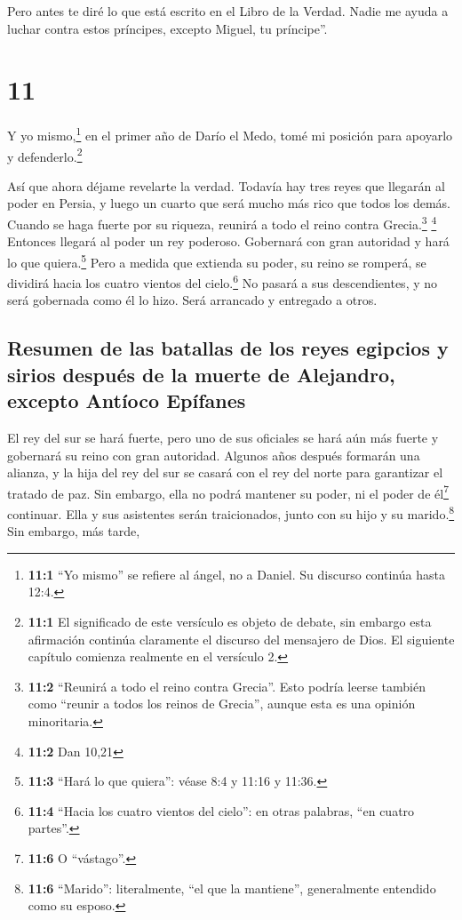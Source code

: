  Pero antes te diré lo que está escrito en el Libro de la
Verdad. Nadie me ayuda a luchar contra estos príncipes, excepto Miguel,
tu príncipe''.

\hypertarget{section-10}{%
\section{11}\label{section-10}}

 Y yo mismo,\footnote{\textbf{11:1} ``Yo mismo'' se
  refiere al ángel, no a Daniel. Su discurso continúa hasta 12:4.} en el
primer año de Darío el Medo, tomé mi posición para apoyarlo y
defenderlo.\footnote{\textbf{11:1} El significado de este versículo es
  objeto de debate, sin embargo esta afirmación continúa claramente el
  discurso del mensajero de Dios. El siguiente capítulo comienza
  realmente en el versículo 2.}

 Así que ahora déjame revelarte la verdad. Todavía hay
tres reyes que llegarán al poder en Persia, y luego un cuarto que será
mucho más rico que todos los demás. Cuando se haga fuerte por su
riqueza, reunirá a todo el reino contra Grecia.\footnote{\textbf{11:2}
  ``Reunirá a todo el reino contra Grecia''. Esto podría leerse también
  como ``reunir a todos los reinos de Grecia'', aunque esta es una
  opinión minoritaria.} \footnote{\textbf{11:2} Dan 10,21}
 Entonces llegará al poder un rey poderoso. Gobernará con
gran autoridad y hará lo que quiera.\footnote{\textbf{11:3} ``Hará lo
  que quiera'': véase 8:4 y 11:16 y 11:36.}  Pero a medida
que extienda su poder, su reino se romperá, se dividirá hacia los cuatro
vientos del cielo.\footnote{\textbf{11:4} ``Hacia los cuatro vientos del
  cielo'': en otras palabras, ``en cuatro partes''.} No pasará a sus
descendientes, y no será gobernada como él lo hizo. Será arrancado y
entregado a otros.

\hypertarget{resumen-de-las-batallas-de-los-reyes-egipcios-y-sirios-despuuxe9s-de-la-muerte-de-alejandro-excepto-antuxedoco-epuxedfanes}{%
\subsection{Resumen de las batallas de los reyes egipcios y sirios
después de la muerte de Alejandro, excepto Antíoco
Epífanes}\label{resumen-de-las-batallas-de-los-reyes-egipcios-y-sirios-despuuxe9s-de-la-muerte-de-alejandro-excepto-antuxedoco-epuxedfanes}}

 El rey del sur se hará fuerte, pero uno de sus oficiales
se hará aún más fuerte y gobernará su reino con gran autoridad.
 Algunos años después formarán una alianza, y la hija del
rey del sur se casará con el rey del norte para garantizar el tratado de
paz. Sin embargo, ella no podrá mantener su poder, ni el poder de
él\footnote{\textbf{11:6} O ``vástago''.} continuar. Ella y sus
asistentes serán traicionados, junto con su hijo y su marido.\footnote{\textbf{11:6}
  ``Marido'': literalmente, ``el que la mantiene'', generalmente
  entendido como su esposo.} Sin embargo, más tarde,

